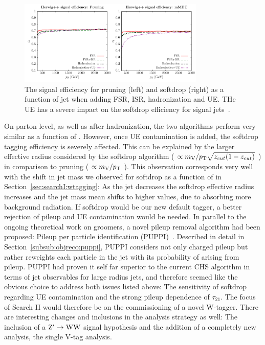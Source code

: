\begin{figure}[h!]
\centering
\includegraphics[width=0.79\textwidth]{figures/analysis/search2/misc/pruningvssd_ue.pdf}
\caption{The signal efficiency for pruning (left) and softdrop (right) as a function of jet \PT when adding FSR, ISR, hadronization and UE. THe UE has a severe impact on the softdrop efficiency for signal jets~\cite{Dasgupta:2015yua}. }
\label{fig:searchII:ue}
\end{figure}

On parton level, as well as after hadronization, the two algorithms perform very similar as a function of \PT. However, once UE contamination is added, the softdrop tagging efficiency is severely affected. This can be explained by the larger effective radius considered by the softdrop algorithm ( $\propto m_{\mathrm{V}}/p_{\mathrm{T}} \sqrt{z_{cut}(1-z_{cut})}$ ) in comparison to pruning ( $\propto m_{\mathrm{V}}/p_{\mathrm{T}}$ ). This observation corresponds very well with the shift in jet mass we observed for softdrop as a function of \PT in Section~\ref{sec:searchI:wtagging}: As the jet \PT decreases the softdrop effective radius increases and the jet mass mean shifts to higher values, due to absorbing more background radiation. If softdrop would be our new default tagger, a better rejection of pileup and UE contamination would be needed. In parallel to the ongoing theoretical work on groomers, a novel pileup removal algorithm had been proposed: Pileup per particle identification (PUPPI)~\cite{Bertolini2014}. Described in detail in Section~\ref{subsub:objreco:puppi}, PUPPI considers not only charged pileup but rather reweights each particle in the jet with its probability of arising from pileup. PUPPI had proven it self far superior to the current CHS algorithm in terms of jet observables for large radius jets, and therefore seemed like the obvious choice to address both issues listed above: The sensitivity of softdrop regarding UE contamination and the strong pileup dependence of $\tau_{21}$. The focus of Search II would therefore be on the commissioning of a novel W-tagger. There are interesting changes and inclusions in the analysis strategy as well: The inclusion of a $\mathrm{Z}^\prime \rightarrow \mathrm{W}\mathrm{W}$ signal hypothesis and the addition of a completely new analysis, the single V-tag analysis.

